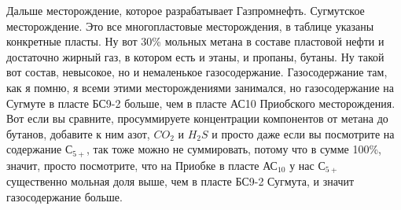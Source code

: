 \documentclass[main.tex]{subfiles}
\begin{document}
Дальше месторождение, которое разрабатывает Газпромнефть.
Сугмутское месторождение.
Это все многопластовые месторождения, в таблице указаны конкретные пласты.
Ну вот 30\% мольных метана в составе пластовой нефти и достаточно жирный газ, в котором есть и этаны, и пропаны, бутаны.
Ну такой вот состав, невысокое, но и немаленькое газосодержание.
Газосодержание там, как я помню, я всеми этими месторождениями занимался, но газосодержание на Сугмуте в пласте БС9-2 больше, чем в пласте АС10 Приобского месторождения.
Вот если вы сравните, просуммируете концентрации компонентов от метана до бутанов, добавите к ним азот, $CO_2$ и $H_2S$ и просто даже если вы посмотрите на содержание $С_{5+}$, так тоже можно не суммировать, потому что в сумме 100\%, значит, просто посмотрите, что на Приобке в пласте АС$_{10}$ у нас $С_{5+}$ существенно мольная доля выше, чем в пласте БС9-2 Сугмута, и значит газосодержание больше.
\end{document}
